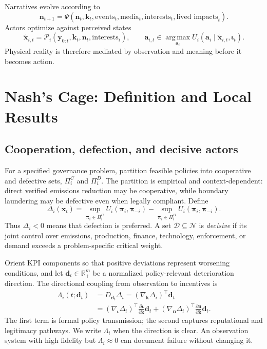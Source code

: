 \documentclass[11pt,a4paper]{article}
\numberwithin{equation}{section}
\theoremstyle{definition}
\theoremstyle{plain}
\theoremstyle{remark}
\newcommand{\R}{\mathbb{R}}
\newcommand{\argmax}{\operatorname*{arg\,max}}
\newcommand{\policy}{\boldsymbol{\pi}}
\newcommand{\state}{\bm{x}}
\newcommand{\kpi}{\bm{k}}
\newcommand{\action}{\bm{a}}
\newcommand{\inst}{\bm{\iota}}
\newcommand{\narr}{\bm{n}}
\begin{document}
Narratives evolve according to
\begin{equation}
\narr_{t+1}=\Psi(\narr_t,\kpi_t,\text{events}_t,\text{media}_t,
\text{interests}_t,\text{lived impacts}_t).
\label{eq:narrative}
\end{equation}
Actors optimize against perceived states
\begin{equation}
  \widetilde{\state}_{i,t}=\mathcal P_i(\bm{y}_{0:t},\kpi_t,\narr_t,\text{interests}_i),
  \qquad
  \action_{i,t}\in\argmax_{\action_i}U_i(\action_i\mid \widetilde{\state}_{i,t},\inst_t).
\label{eq:perception}
\end{equation}
Physical reality is therefore mediated by observation and meaning before it becomes action.

\section{Nash's Cage: Definition and Local Results}

\subsection{Cooperation, defection, and decisive actors}

For a specified governance problem, partition feasible policies into cooperative and defective sets, $\Pi_i^C$ and $\Pi_i^D$. The partition is empirical and context-dependent: direct verified emissions reduction may be cooperative, while boundary laundering may be defective even when legally compliant. Define
\begin{equation}
\Delta_i(\state_t)=
\sup_{\policy_i\in\Pi_i^C}U_i(\policy_i,\policy_{-i})
-
\sup_{\policy_i\in\Pi_i^D}U_i(\policy_i,\policy_{-i}).
\label{eq:payoffdiff}
\end{equation}
Thus $\Delta_i<0$ means that defection is preferred. A set $\mathcal D\subseteq\mathcal N$ is \emph{decisive} if its joint control over emissions, production, finance, technology, enforcement, or demand exceeds a problem-specific critical weight.

Orient KPI components so that positive deviations represent worsening conditions, and let $\bm d_t\in\R_+^m$ be a normalized policy-relevant deterioration direction. The directional coupling from observation to incentives is
\begin{align}
\Lambda_i(t;\bm d_t)
&=D_{\bm d_t}\Delta_i
=(\nabla_{\kpi}\Delta_i)^{\top}\bm d_t \\
&=(\nabla_{\inst}\Delta_i)^{\top}
\frac{\partial \inst}{\partial \kpi}\bm d_t
+ (\nabla_{\narr}\Delta_i)^{\top}
\frac{\partial \narr}{\partial \kpi}\bm d_t.
\label{eq:payoffcoupling}
\end{align}
The first term is formal policy transmission; the second captures reputational and legitimacy pathways. We write $\Lambda_i$ when the direction is clear. An observation system with high fidelity but $\Lambda_i\approx0$ can document failure without changing it.
\end{document}
